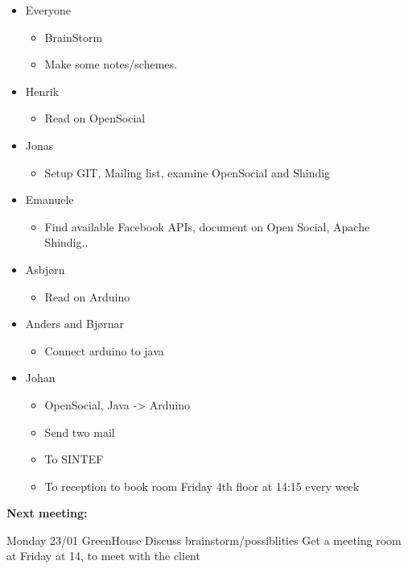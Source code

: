 \begin{itemize}
	\item Everyone
	\begin{itemize}
		\item BrainStorm
		\item Make some notes/schemes.
	\end{itemize}

	\item Henrik
	\begin{itemize}
		\item Read on OpenSocial
	\end{itemize}

	\item Jonas
	\begin{itemize}
		\item Setup GIT, Mailing list, examine OpenSocial and Shindig
	\end{itemize}

	\item Emanuele
	\begin{itemize}
		\item Find available Facebook APIs, document on Open Social, Apache Shindig..
	\end{itemize}

	\item Asbjørn
	\begin{itemize}
		\item Read on Arduino
	\end{itemize}

	\item Anders and Bjørnar
	\begin{itemize}
		\item Connect arduino to java
	\end{itemize}

	\item Johan
	\begin{itemize}
		\item OpenSocial, Java -> Arduino
		\item Send two mail
		\item To SINTEF
		\item To reception to book room Friday 4th floor at 14:15 every week
	\end{itemize}
\end{itemize}


\textbf{Next meeting:}

Monday 23/01 GreenHouse\newline
Discuss brainstorm/possiblities\newline
Get a meeting room at Friday at 14, to meet with the client
